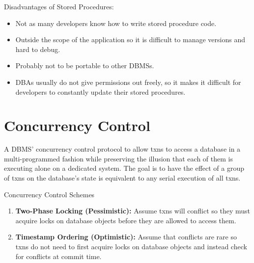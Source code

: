 \documentclass[11pt]{article}
\begin{document}
Disadvantages of Stored Procedures:
\begin{itemize}
    \item
    Not as many developers know how to write stored procedure code.
    
    \item
    Outside the scope of the application so it is difficult to manage versions and hard to 
    debug.
    
    \item
    Probably not to be portable to other DBMSs.
    
    \item
    DBAs usually do not give permissions out freely, so it makes it difficult for developers to 
    constantly update their stored procedures.
\end{itemize}

\section{Concurrency Control}
A DBMS' concurrency control protocol to allow txns to access a database in a multi-programmed 
fashion while preserving the illusion that each of them is executing alone on a dedicated system.
The goal is to have the effect of a group of txns on the database's state is equivalent to any 
serial execution of all txns.
    
Concurrency Control Schemes
\begin{enumerate}
    \item \textbf{Two-Phase Locking (Pessimistic):}
    Assume txns will conflict so they must acquire locks on database objects before they are 
    allowed to access them.
    
    \item \textbf{Timestamp Ordering (Optimistic):}
    Assume that conflicts are rare so txns do not need to first acquire locks on database objects 
    and instead check for conflicts at commit time.
\end{enumerate}

%     
\end{document}
